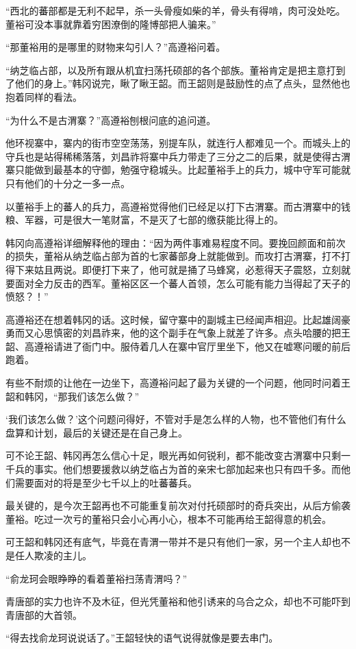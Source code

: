 “西北的蕃部都是无利不起早，杀一头骨瘦如柴的羊，骨头有得啃，肉可没处吃。董裕可没本事就靠着穷困潦倒的隆博部把人骗来。”

“那董裕用的是哪里的财物来勾引人？”高遵裕问着。

“纳芝临占部，以及所有跟从机宜扫荡托硕部的各个部族。董裕肯定是把主意打到了他们的身上。”韩冈说完，瞅了瞅王韶。而王韶则是鼓励性的点了点头，显然他也抱着同样的看法。

“为什么不是古渭寨？”高遵裕刨根问底的追问道。

他环视寨中，寨内的街市空空荡荡，别提车队，就连行人都难见一个。而城头上的守兵也是站得稀稀落落，刘昌祚将寨中兵力带走了三分之二的后果，就是使得古渭寨只能做到最基本的守御，勉强守稳城头。比起董裕手上的兵力，城中守军可能就只有他们的十分之一多一点。

以董裕手上的蕃人的兵力，高遵裕觉得他们已经足以打下古渭寨。而古渭寨中的钱粮、军器，可是很大一笔财富，不是灭了七部的缴获能比得上的。

韩冈向高遵裕详细解释他的理由：“因为两件事难易程度不同。要挽回颜面和前次的损失，董裕从纳芝临占部为首的七家蕃部身上就能做到。而攻打古渭寨，打不打得下来姑且两说。即便打下来了，他可就是捅了马蜂窝，必惹得天子震怒，立刻就要面对全力反击的西军。董裕区区一个蕃人首领，怎么可能有能力当得起了天子的愤怒？！”

高遵裕还在想着韩冈的话。这时候，留守寨中的副城主已经闻声相迎。比起雄阔豪勇而又心思慎密的刘昌祚来，他的这个副手在气象上就差了许多。点头哈腰的把王韶、高遵裕请进了衙门中。服侍着几人在寨中官厅里坐下，他又在嘘寒问暖的前后跑着。

有些不耐烦的让他在一边坐下，高遵裕问起了最为关键的一个问题，他同时问着王韶和韩冈，“那我们该怎么做？”

‘我们该怎么做？’这个问题问得好，不管对手是怎么样的人物，也不管他们有什么盘算和计划，最后的关键还是在自己身上。

可不论王韶、韩冈再怎么信心十足，眼光再如何锐利，都不能改变古渭寨中只剩一千兵的事实。他们想要援救以纳芝临占为首的亲宋七部加起来也只有四千多。而他们需要面对的将是至少七千以上的吐蕃蕃兵。

最关键的，是今次王韶再也不可能重复前次对付托硕部时的奇兵突出，从后方偷袭董裕。吃过一次亏的董裕只会小心再小心，根本不可能再给王韶得意的机会。

可王韶和韩冈还有底气，毕竟在青渭一带并不是只有他们一家，另一个主人却也不是任人欺凌的主儿。

“俞龙珂会眼睁睁的看着董裕扫荡青渭吗？”

青唐部的实力也许不及木征，但光凭董裕和他引诱来的乌合之众，却也不可能吓到青唐部的大首领。

“得去找俞龙珂说说话了。”王韶轻快的语气说得就像是要去串门。

